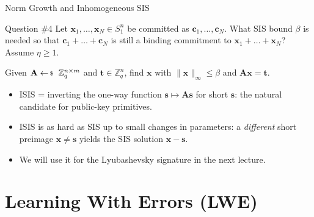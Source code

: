 \documentclass{zkdl-presentation-template}
\begin{document}
    \begin{frame}{Norm Growth and Inhomogeneous SIS}
        \begin{questionblock}{Question \#4}
            Let $\mathbf{x}_1,\dots,\mathbf{x}_N \in S_1^n$ be committed as $\mathbf{c}_1,\dots,\mathbf{c}_N$. What SIS bound $\beta$ is needed so that $\mathbf{c}_1+\dots+\mathbf{c}_N$ is still a binding commitment to $\mathbf{x}_1+\dots+\mathbf{x}_N$? Assume $\eta \geq 1$.
        \end{questionblock}
        \pause

        \begin{definition}
            Given $\mathbf{A} \leftarrowS \mathbb{Z}_q^{n \times m}$ and $\mathbf{t} \in \mathbb{Z}_q^n$, find $\mathbf{x}$ with $\|\mathbf{x}\|_{\infty} \leq \beta$ and $\mathbf{A}\mathbf{x} = \mathbf{t}$.
        \end{definition}
        \pause

        \begin{itemize}
            \item ISIS = inverting the one-way function $\mathbf{s} \mapsto \mathbf{A}\mathbf{s}$ for short $\mathbf{s}$: the natural candidate for public-key primitives.
            \item ISIS is as hard as SIS up to small changes in parameters: a \emph{different} short preimage $\mathbf{x} \neq \mathbf{s}$ yields the SIS solution $\mathbf{x}-\mathbf{s}$.
            \item We will use it for the Lyubashevsky signature in the next lecture.
        \end{itemize}
    \end{frame}

    \section{Learning With Errors (LWE)}
\end{document}
